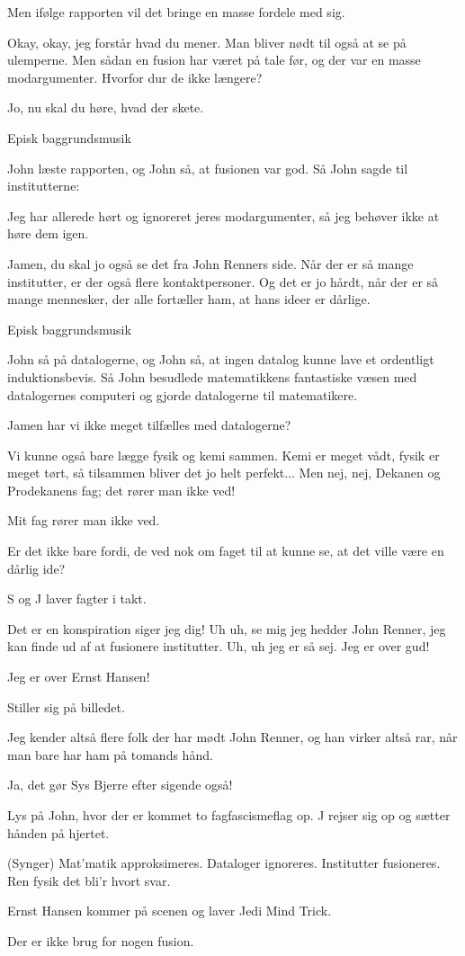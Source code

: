 \documentclass[a4paper,11pt]{article}
\begin{document}
\begin{sketch}
 Men ifølge rapporten vil det bringe en masse fordele med sig.

 Okay, okay, jeg forstår hvad du mener. Man bliver nødt til også at se på ulemperne. Men sådan en fusion har været på tale før, og der var en masse modargumenter. Hvorfor dur de ikke længere?

 Jo, nu skal du høre, hvad der skete.

\scene Episk baggrundsmusik

 John læste rapporten, og John så, at fusionen var god. Så John sagde til institutterne:

 Jeg har allerede hørt og ignoreret jeres modargumenter, så jeg behøver ikke at høre dem igen.

 Jamen, du skal jo også se det fra John Renners side. Når der er så mange institutter, er der også flere kontaktpersoner. Og det er jo hårdt, når der er så mange mennesker, der alle fortæller ham, at hans ideer er dårlige.

\scene Episk baggrundsmusik

 John så på datalogerne, og John så, at ingen datalog kunne lave et ordentligt induktionsbevis. Så John besudlede matematikkens fantastiske væsen med datalogernes computeri og gjorde datalogerne til matematikere.

 Jamen har vi ikke meget tilfælles med datalogerne?

 Vi kunne også bare lægge fysik og kemi sammen. Kemi er meget vådt, fysik er meget tørt, så tilsammen bliver det jo helt perfekt... Men nej, nej, Dekanen og Prodekanens fag; det rører man ikke ved!

 Mit fag rører man ikke ved.

 Er det ikke bare fordi, de ved nok om faget til at kunne se, at det ville være en dårlig ide?

\scene S og J laver fagter i takt.

 Det er en konspiration siger jeg dig! Uh uh, se mig jeg hedder John Renner, jeg kan finde ud af at fusionere institutter. Uh, uh jeg er så sej. Jeg er over gud!

 Jeg er over Ernst Hansen!

\scene Stiller sig på billedet.

 Jeg kender altså flere folk der har mødt John Renner, og han virker altså rar, når man bare har ham på tomands hånd.

 Ja, det gør Sys Bjerre efter sigende også!

\scene Lys på John, hvor der er kommet to fagfascismeflag op. J rejser sig op og sætter hånden på hjertet.

 (Synger) Mat'matik approksimeres. Dataloger ignoreres. Institutter fusioneres. Ren fysik det bli'r hvort svar.

\scene Ernst Hansen kommer på scenen og laver Jedi Mind Trick.

 Der er ikke brug for nogen fusion.
\end{sketch}
\end{document}
